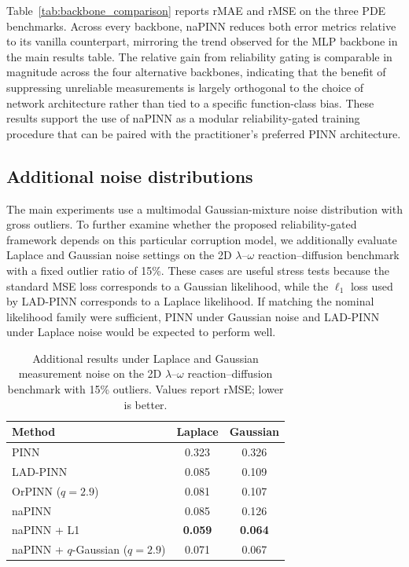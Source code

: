 \documentclass{article}
\theoremstyle{plain}
\theoremstyle{definition}
\theoremstyle{remark}
\begin{document}
Table~\ref{tab:backbone_comparison} reports rMAE and rMSE on the three PDE
benchmarks. Across every backbone, naPINN reduces both error metrics
relative to its vanilla counterpart, mirroring the trend observed for the MLP
backbone in the main results table. %
The relative gain from reliability gating is comparable in magnitude across
the four alternative backbones, indicating that the benefit of suppressing
unreliable measurements is largely orthogonal to the choice of network
architecture rather than tied to a specific function-class bias.
These results support the use of naPINN as a modular reliability-gated
training procedure that can be paired with the practitioner's preferred PINN
architecture.

\subsection{Additional noise distributions}
\label{appendix:additional_noise_distributions}

The main experiments use a multimodal Gaussian-mixture noise distribution with gross outliers.
To further examine whether the proposed reliability-gated framework depends on this particular corruption model, we additionally evaluate Laplace and Gaussian noise settings on the 2D $\lambda$--$\omega$ reaction--diffusion benchmark with a fixed outlier ratio of 15\%.
These cases are useful stress tests because the standard MSE loss corresponds to a Gaussian likelihood, while the $\ell_1$ loss used by LAD-PINN corresponds to a Laplace likelihood.
If matching the nominal likelihood family were sufficient, PINN under Gaussian noise and LAD-PINN under Laplace noise would be expected to perform well.

\begin{sc}
\begin{table}[h]
\centering
\small
\caption{Additional results under Laplace and Gaussian measurement noise on the 2D $\lambda$--$\omega$ reaction--diffusion benchmark with 15\% outliers. Values report rMSE; lower is better.}
\label{tab:additional_noise_distributions}
\setlength{\tabcolsep}{8pt}
\begin{tabular}{lcc}
\toprule
Method & Laplace & Gaussian \\
\midrule
PINN & 0.323 & 0.326 \\
LAD-PINN & 0.085 & 0.109 \\
OrPINN ($q=2.9$) & 0.081 & 0.107 \\
naPINN & 0.085 & 0.126 \\
naPINN + L1 & \textbf{0.059} & \textbf{0.064} \\
naPINN + $q$-Gaussian ($q=2.9$) & 0.071 & 0.067 \\
\bottomrule
\end{tabular}
\end{table}
\end{sc}
\end{document}
